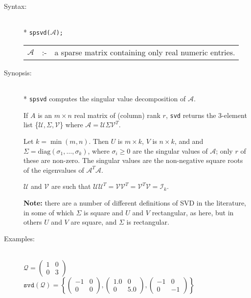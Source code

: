 \begin{description}
\item[Syntax:]\mbox{}\\*
\texttt{spsvd($\mathcal{A}$);}\\[2mm]
\begin{tabular}{l l l}
$\mathcal{A}$ &:-& a sparse matrix containing only real numeric entries.
\end{tabular}

\item[Synopsis:]\mbox{}\\*
\texttt{spsvd} computes the singular value decomposition of $\mathcal{A}$.

If $A$
is an $m\times n$ real matrix of (column) rank $r$, \texttt{svd} returns the
3-element list \{$\mathcal{U},\Sigma,\mathcal{V}$\} where $\mathcal{A} =
\mathcal{U} \Sigma \mathcal{V}^T$.

Let $k=\min(m,n)$.  Then $U$ is $m\times k$,
$V$ is $n\times k$, and and $\Sigma = \mbox{diag}(\sigma_{1}, \ldots ,\sigma_{k})$,
where $\sigma_{i}\ge 0$ are the singular values of $\mathcal{A}$; only $r$ of
these are non-zero.  The singular values are the non-negative square roots of
the eigenvalues of $\mathcal{A}^T \mathcal{A}$.

$\mathcal{U}$ and $\mathcal{V}$ are such that $\mathcal{UU}^T = \mathcal{VV}^T =
\mathcal{V}^T \mathcal{V} = \mathcal{I}_k$.

\textbf{Note:} there are a number of different definitions of SVD in the
literature, in some of which $\Sigma$ is square and $U$ and $V$ rectangular, as
here, but in others $U$ and $V$ are square, and $\Sigma$ is rectangular.

\item[Examples:]\mbox{}\\
 \( \mathcal{Q} = \begin{pmatrix} 1 & 0 \\ 0 & 3 \end{pmatrix}\) \\[2mm]
 \( \mathtt{svd(\mathcal{Q})} =
       \left\{
         \begin{pmatrix} -1 & 0 \\ 0 & 0 \end{pmatrix},
         \begin{pmatrix} 1.0 & 0 \\ 0 & 5.0 \end{pmatrix},
         \begin{pmatrix} -1 & 0 \\ 0 & -1 \end{pmatrix}
       \right\}\)
\end{description}

